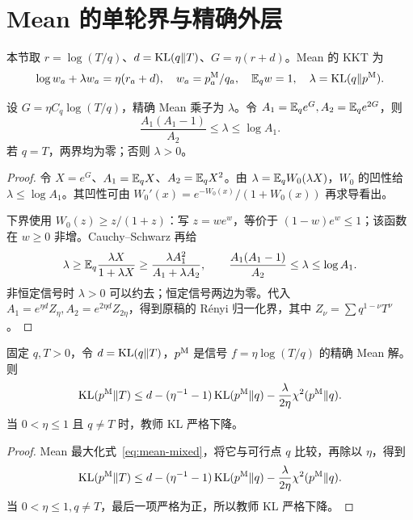 \section{Mean 的单轮界与精确外层}
本节取 $r=\log(T/q)$、$d=\operatorname{KL}(q\Vert T)$、$G=\eta(r+d)$。Mean 的 KKT 为
\begin{equation}
\log w_a+\lambda w_a=\eta(r_a+d),\quad
w_a=p_a^{\rm M}/q_a,\quad \mathbb E_qw=1,\quad
\lambda=\operatorname{KL}(q\Vert p^{\rm M}).
\end{equation}
\begin{proposition}
设 $G=\eta C_q\log(T/q)$，精确 Mean 乘子为 $\lambda$。令 $A_1=\mathbb E_qe^G,A_2=\mathbb E_qe^{2G}$，则
\begin{equation}
\frac{A_1(A_1-1)}{A_2}\le\lambda\le\log A_1.
\end{equation}
若 $q=T$，两界均为零；否则 $\lambda>0$。
\end{proposition}
\begin{proof}
令 $X=e^G$、$A_1=\mathbb E_qX$、$A_2=\mathbb E_qX^2$。由 $\lambda=\mathbb E_qW_0(\lambda X)$，$W_0$ 的凹性给 $\lambda\le\log A_1$。其凹性可由 $W_0'(x)=e^{-W_0(x)}/(1+W_0(x))$ 再求导看出。

下界使用 $W_0(z)\ge z/(1+z)$：写 $z=we^w$，等价于 $(1-w)e^w\le1$；该函数在 $w\ge0$ 非增。Cauchy--Schwarz 再给
\begin{equation}
\lambda\ge\mathbb E_q\frac{\lambda X}{1+\lambda X}
\ge\frac{\lambda A_1^2}{A_1+\lambda A_2},
\qquad
\frac{A_1(A_1-1)}{A_2}\le\lambda\le\log A_1.
\end{equation}
非恒定信号时 $\lambda>0$ 可以约去；恒定信号两边为零。代入 $A_1=e^{\eta d}Z_\eta,A_2=e^{2\eta d}Z_{2\eta}$，得到原稿的 Rényi 归一化界，其中 $Z_\nu=\sum q^{1-\nu}T^\nu$。
\end{proof}

\begin{proposition}
固定 $q,T>0$，令 $d=\operatorname{KL}(q\Vert T)$，$p^{\rm M}$ 是信号 $f=\eta\log(T/q)$ 的精确 Mean 解。则
\begin{equation}
\operatorname{KL}(p^{\rm M}\Vert T)\le d-(\eta^{-1}-1)\operatorname{KL}(p^{\rm M}\Vert q)
-\frac{\lambda}{2\eta}\chi^2(p^{\rm M}\Vert q).
\end{equation}
当 $0<\eta\le1$ 且 $q\ne T$ 时，教师 KL 严格下降。
\end{proposition}
\begin{proof}
Mean 最大化式~\eqref{eq:mean-mixed}，将它与可行点 $q$ 比较，再除以 $\eta$，得到
\begin{equation}
\operatorname{KL}(p^{\rm M}\Vert T)
\le d-(\eta^{-1}-1)\operatorname{KL}(p^{\rm M}\Vert q)
-\frac{\lambda}{2\eta}\chi^2(p^{\rm M}\Vert q).
\end{equation}
当 $0<\eta\le1,q\ne T$，最后一项严格为正，所以教师 KL 严格下降。
\end{proof}

